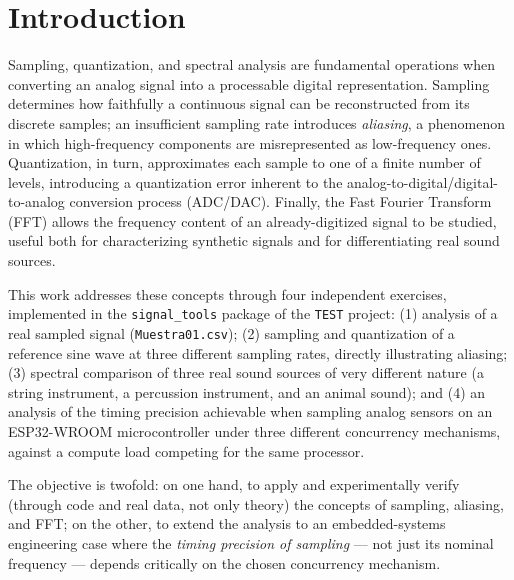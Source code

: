 
\section{Introduction}

Sampling, quantization, and spectral analysis are fundamental operations when converting an analog signal into a processable digital representation. Sampling determines how faithfully a continuous signal can be reconstructed from its discrete samples; an insufficient sampling rate introduces \emph{aliasing}, a phenomenon in which high-frequency components are misrepresented as low-frequency ones. Quantization, in turn, approximates each sample to one of a finite number of levels, introducing a quantization error inherent to the analog-to-digital/digital-to-analog conversion process (ADC/DAC). Finally, the Fast Fourier Transform (FFT) allows the frequency content of an already-digitized signal to be studied, useful both for characterizing synthetic signals and for differentiating real sound sources.

This work addresses these concepts through four independent exercises, implemented in the \texttt{signal\_tools} package of the \texttt{TEST} project: (1) analysis of a real sampled signal (\texttt{Muestra01.csv}); (2) sampling and quantization of a reference sine wave at three different sampling rates, directly illustrating aliasing; (3) spectral comparison of three real sound sources of very different nature (a string instrument, a percussion instrument, and an animal sound); and (4) an analysis of the timing precision achievable when sampling analog sensors on an ESP32-WROOM microcontroller under three different concurrency mechanisms, against a compute load competing for the same processor.

The objective is twofold: on one hand, to apply and experimentally verify (through code and real data, not only theory) the concepts of sampling, aliasing, and FFT; on the other, to extend the analysis to an embedded-systems engineering case where the \emph{timing precision of sampling} — not just its nominal frequency — depends critically on the chosen concurrency mechanism.

